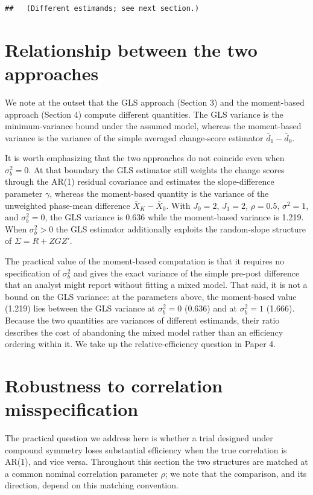 \documentclass[
  11pt,
]{article}
\begin{document}
\begin{verbatim}
##   (Different estimands; see next section.)
\end{verbatim}

\section{Relationship between the two approaches}\label{relationship-between-the-two-approaches}

We note at the outset that the GLS approach (Section 3)
and the moment-based approach (Section 4) compute
different quantities. The GLS variance is the
minimum-variance bound under the assumed model, whereas
the moment-based variance is the variance of the simple
averaged change-score estimator \(\bar{d}_1 - \bar{d}_0\).

It is worth emphasizing that the two approaches do not
coincide even when \(\sigma_b^2 = 0\). At that boundary the
GLS estimator still weights the change scores through the
AR(1) residual covariance and estimates the
slope-difference parameter \(\gamma\), whereas the
moment-based quantity is the variance of the unweighted
phase-mean difference \(\bar{X}_K - \bar{X}_0\). With
\(J_0 = 2\), \(J_1 = 2\), \(\rho = 0.5\), \(\sigma^2 = 1\), and
\(\sigma_b^2 = 0\), the GLS variance is 0.636 while the
moment-based variance is 1.219. When \(\sigma_b^2 > 0\) the
GLS estimator additionally exploits the random-slope
structure of \(\Sigma = R + ZGZ'\).

The practical value of the moment-based computation is
that it requires no specification of \(\sigma_b^2\) and
gives the exact variance of the simple pre-post
difference that an analyst might report without fitting
a mixed model. That said, it is not a bound on the GLS
variance: at the parameters above, the moment-based value
(1.219) lies between the GLS variance at \(\sigma_b^2 = 0\)
(0.636) and at \(\sigma_b^2 = 1\) (1.666). Because the two
quantities are variances of different estimands, their
ratio describes the cost of abandoning the mixed model
rather than an efficiency ordering within it. We take up
the relative-efficiency question in Paper 4.

\section{Robustness to correlation misspecification}\label{robustness-to-correlation-misspecification}

The practical question we address here is whether a
trial designed under compound symmetry loses substantial
efficiency when the true correlation is AR(1), and vice
versa. Throughout this section the two structures are
matched at a common nominal correlation parameter \(\rho\);
we note that the comparison, and its direction, depend on
this matching convention.
\end{document}
